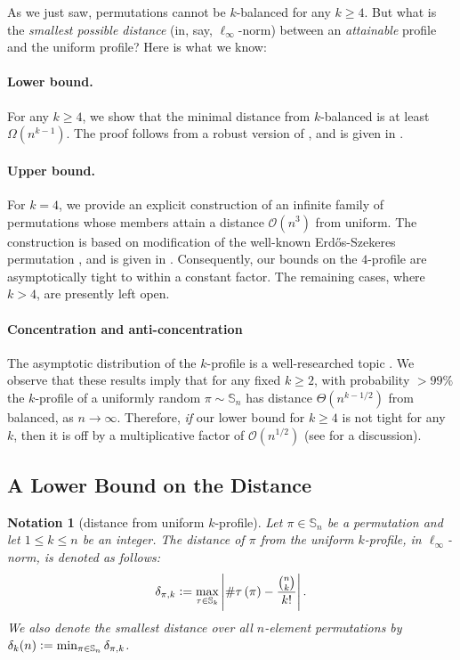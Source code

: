 \documentclass{article}
\newtheorem{notation}[theorem]{Notation}
\newcommand{\Sn}{\mathbb{S}_n}
\newcommand{\pc}[2]{{\# \mathtt{ #1 } \left( #2 \right)}}
\newcommand{\eqdef}{\vcentcolon=}
\newcommand{\ESZ}{Erd\H{o}s-Szekeres\xspace}
\theoremstyle{remark}
\theoremstyle{plain}
\begin{document}
As we just saw, permutations cannot be $k$-balanced for any $k \ge 4$. But what is the \emph{smallest possible distance} (in, say, $\ell_\infty$-norm) between an \emph{attainable} profile and the uniform profile? Here is what we know:

\paragraph{Lower bound.} For any $k \ge 4$, we show that the minimal distance from $k$-balanced is at least $\Omega\left(n^{k-1} \right)$. The proof follows from a robust version of , and is given in .

\paragraph{Upper bound.} For $k=4$, we provide an explicit construction of an infinite family of permutations whose members attain a distance $\mathcal{O}\left(n^3\right)$ from uniform. The construction is based on modification of the well-known \ESZ permutation \cite{erdos1935combinatorial}, and is given in . Consequently, our bounds on the $4$-profile are asymptotically tight to within a constant factor. The remaining cases, where $k > 4$, are presently left open.

\paragraph{Concentration and anti-concentration} The asymptotic distribution of the $k$-profile is a well-researched topic \cite{even2020patterns, janson2013asymptotic, hofer2018central, bona2007copies}. We observe that these results imply that for any fixed $k \ge 2$, with probability $> 99\%$ the $k$-profile of a uniformly random $\pi \sim \Sn$ has distance $\Theta(n^{k-1/2})$ from balanced, as $n \to \infty$. Therefore, \emph{if} our lower bound for $k \ge 4$ is not tight for any $k$, then it is off by a multiplicative factor of $\mathcal{O}(n^{1/2})$ (see  for a discussion).
\subsection{A Lower Bound on the Distance}
\label{subsect:lowerbound}

\begin{notation}[distance from uniform $k$-profile]
    Let $\pi\in\Sn$ be a permutation and let $1 \le k \le n$ be an integer. The distance of $\pi$ from the uniform $k$-profile, in $\ell_\infty$-norm, is denoted as follows:
    \[
        \delta_{\pi,k} \eqdef \max_{\tau\in\mathbb{S}_k} \left| \pc{\tau}{\pi} - \frac{\binom{n}{k}}{k!} \right|.
    \]
    We also denote the \emph{smallest} distance over \emph{all} $n$-element permutations by $\delta_k(n) \eqdef \min_{\pi \in \Sn} \delta_{\pi, k}$.
\end{notation}
\end{document}
